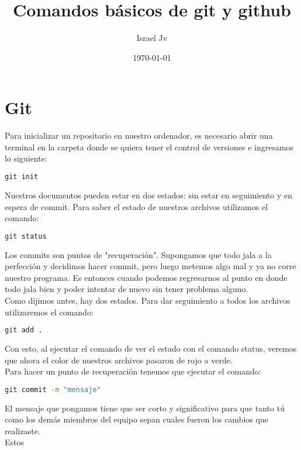 \documentclass{article}
\begin{document}
	\title{Comandos b\'asicos de git y github}
	\date{\today}
	\author{Israel Jv}
	\maketitle
	
	\section{Git}
	Para inicializar un repositorio en nuestro ordenador, es necesario abrir una terminal en la carpeta donde se quiera tener el control de versiones e ingresamos lo siguiente:
	
	\begin{lstlisting}[language=Bash]
		git init
	\end{lstlisting}
	
	Nuestros documentos pueden estar en dos estados: sin estar en seguimiento y en espera de commit.
	Para saber el estado de nuestros archivos utilizamos el comando:
	
	\begin{lstlisting}[language=Bash]
		git status
	\end{lstlisting}

	Los commits son puntos de "recuperaci\'on". Supongamos que todo jala a la perfecci\'on y decidimos hacer commit, pero luego metemos algo mal y ya no corre nuestro programa. Es entonces cuando podemos regresarnos al punto en donde todo jala bien y poder intentar de nuevo sin tener problema alguno. \\
	Como dijimos antes, hay dos estados. Para dar seguimiento a todos los archivos utilizaremos el comando:
	
	\begin{lstlisting}[language=Bash]
		git add .
	\end{lstlisting}

	Con esto, al ejecutar el comando de ver el estado con el comando status, veremos que ahora el color de nuestros archivos pasaron de rojo a verde. \\
	Para hacer un punto de recuperaci\'on tenemos que ejecutar el comando: 
	
	\begin{lstlisting}[language=Bash]
		git commit -m "mensaje"
	\end{lstlisting}
	
	El mensaje que pongamos tiene que ser corto y significativo para que tanto t\'u como los dem\'as miembros del equipo sepan cuales fueron los cambios que realizaste. \\
	Estos 
	
	
\end{document}
